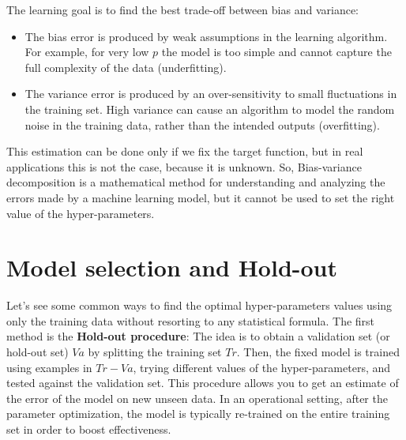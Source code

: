 The learning goal is to find the best trade-off between bias and variance:
\begin{itemize}
    \item The bias error is produced by weak assumptions in the learning algorithm. For example, for very low $p$ the model is too simple and cannot capture the full complexity of the data (underfitting).

    \item The variance error is produced by an over-sensitivity to small      fluctuations in the training set. High variance can cause an algorithm to model the random noise in the training data, rather than the intended outputs (overfitting).
\end{itemize}
This estimation can be done only if we fix the target function, but in real applications this is not the case, because it is unknown. So, Bias-variance decomposition is a mathematical method for understanding and analyzing the errors made by a machine learning model, but it cannot be used to set the right value of the hyper-parameters. 

\section{Model selection and Hold-out}
Let's see some common ways to find the optimal hyper-parameters values using only the training data without resorting to any statistical formula.\newline\newline
The first method is the \textbf{Hold-out procedure}: The idea is to obtain a validation set (or hold-out set) $Va$ by splitting the training set $Tr$. Then, the fixed model is trained using examples in $Tr - Va$, trying different values of the hyper-parameters, and tested against the validation set. This procedure allows you to get an estimate of the error of the model on new unseen data.\newline\newline
In an operational setting, after the parameter optimization, the model is typically re-trained on the entire training set in order to boost effectiveness.

